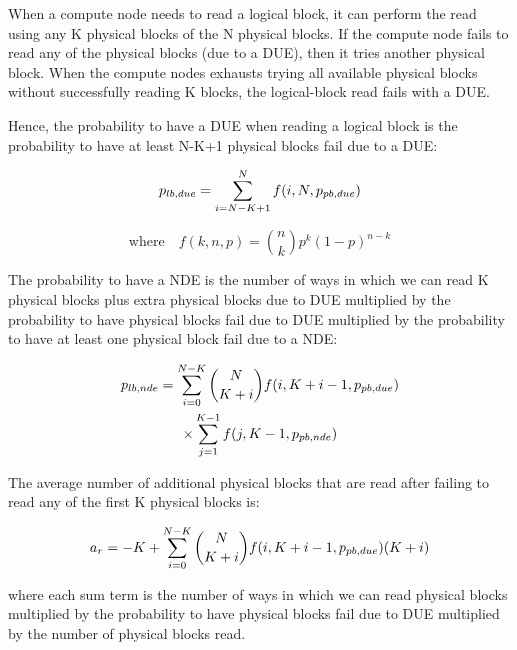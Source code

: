 When a compute node needs to read a logical block, it can perform the read using any K physical blocks of the N physical blocks. If the compute node fails to read any of the physical blocks (due to a DUE), then it tries another physical block. 
When the compute nodes exhausts trying all available physical blocks without successfully reading K blocks, the logical-block read fails with a DUE.

Hence, the probability to have a DUE when reading a logical block is the probability to have at least N-K+1 physical blocks fail due to a DUE:


\begin{equation*}
{p_{lb,due}} = \sum_{i=N-K+1}^{N}f(i,N,{p_{pb,due}})
\end{equation*}

\begin{equation*}
\mathrm{where}\quad
f(k,n,p) = \binom{n}{k}p^{k}(1-p)^{n-k}
\end{equation*}

The probability to have a NDE is the number of ways in which we can read K physical blocks plus extra physical blocks due to DUE multiplied by the probability to have physical blocks fail due to DUE multiplied by the probability to have at least one physical block fail due to a NDE: 

\begin{multline*}
{p_{lb,nde}} = \sum_{i=0}^{N-K}\binom{N}{K+i}f(i,K+i-1,{p_{pb,due}}) \\ 
\times \sum_{j=1}^{K-1}f(j,K-1,{p_{pb,nde}})
\end{multline*}

The average number of additional physical blocks that are read after failing to read any of the first K physical blocks is:


\begin{equation*}
a_r= -K + \sum_{i=0}^{N-K} \binom{N}{K+i} f(i, K+i-1, {p_{pb,due}}) (K+i)
\end{equation*}

\noindent where each sum term is the number of ways in which we can read physical blocks multiplied by the probability to have physical blocks fail due to DUE multiplied by the number of physical blocks read.